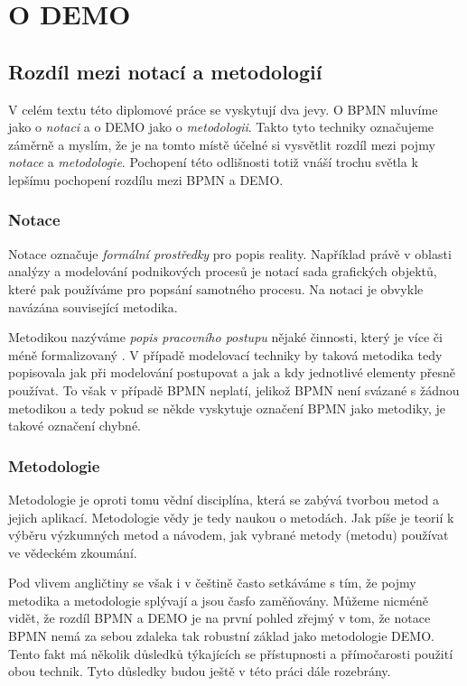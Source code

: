 \section{O DEMO}
\subsection{Rozdíl mezi notací a metodologií}
V celém textu této diplomové práce se vyskytují dva jevy. O BPMN mluvíme jako o \textit{notaci} a o DEMO jako o \textit{metodologii}. Takto tyto techniky označujeme záměrně a myslím, že je na tomto místě účelné si vysvětlit rozdíl mezi pojmy \textit{notace} a \textit{metodologie}. Pochopení této odlišnosti totiž vnáší trochu světla k lepšímu pochopení rozdílu mezi BPMN a DEMO.

\subsubsection{Notace}
Notace označuje \textit{formální prostředky} pro popis reality. Například právě v oblasti analýzy a modelování podnikových procesů je notací sada grafických objektů, které pak používáme pro popsání samotného procesu. Na notaci je obvykle navázána související metodika. \cite{Notace}

Metodikou nazýváme \textit{popis pracovního postupu} nějaké činnosti, který je více či méně formalizovaný \cite{Metodika}. V případě modelovací techniky by taková metodika tedy popisovala jak při modelování postupovat a jak a kdy jednotlivé elementy přesně používat. To však v případě BPMN neplatí, jelikož BPMN není svázané s žádnou metodikou \cite{Vasicek2008} a tedy pokud se někde vyskytuje označení BPMN jako metodiky, je takové označení chybné.

\subsubsection{Metodologie}
Metodologie je oproti tomu vědní disciplína, která se zabývá tvorbou metod a jejich aplikací. Metodologie vědy je tedy naukou o metodách. Jak píše \cite{Ochrana2009} je teorií k výběru výzkumných metod a návodem, jak vybrané metody (metodu) používat ve vědeckém zkoumání.

Pod vlivem angličtiny se však i v češtině často setkáváme s tím, že pojmy metodika a metodologie splývají a jsou časfo zaměňovány. Můžeme nicméně vidět, že rozdíl BPMN a DEMO je na první pohled zřejmý v tom, že notace BPMN nemá za sebou zdaleka tak robustní základ jako metodologie DEMO. Tento fakt má několik důsledků týkajících se přístupnosti a přímočarosti použití obou technik. Tyto důsledky budou ještě v této práci dále rozebrány.

